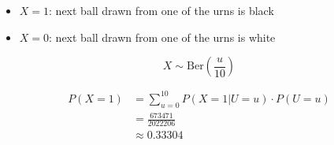 \begin{itemize}
\item{$X=1$: next ball drawn from one of the urns is black}
\item{$X=0$: next ball drawn from one of the urns is white}
\end{itemize}

\[ X \sim \mathrm{Ber}\left( \frac{u}{10} \right) \]

\begin{align*}
P(X=1) &= \sum\limits_{u=0}^{10} P(X=1|U=u) \cdot P(U=u) \\
       &= \frac{673471}{2022206} \\
       &\approx 0.33304
\end{align*}

